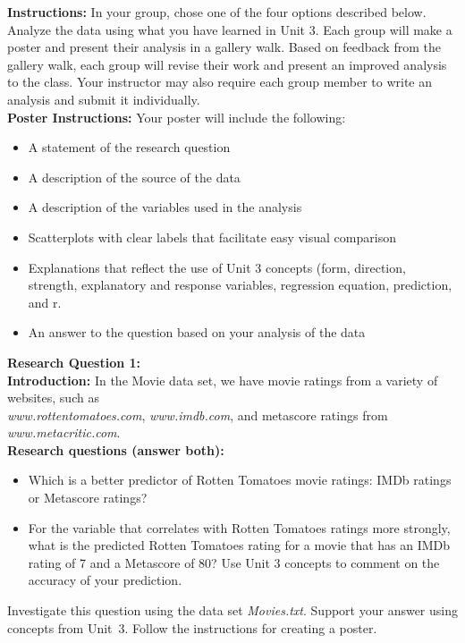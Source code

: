 

\textbf{Instructions:} In your group, chose one of the four options
described below. Analyze the data using what you have learned in Unit
3. Each group will make a poster and present their analysis in a gallery
walk. Based on feedback from the gallery walk, each group will revise
their work and present an improved analysis to the class. Your instructor
may also require each group member to write an analysis and submit
it individually. \\


\textbf{Poster Instructions:} Your poster will include the following: 
\begin{itemize}
\item A statement of the research question 
\item A description of the source of the data 
\item A description of the variables used in the analysis 
\item Scatterplots with clear labels that facilitate easy visual comparison 
\item Explanations that reflect the use of Unit 3 concepts (form, direction,
strength, explanatory and response variables, regression equation,
prediction, and r.
\item An answer to the question based on your analysis of the data \clearpage{}
\end{itemize}
\textbf{\large{}Research Question 1:}\\


\textbf{Introduction:} In the Movie data set, we have movie ratings
from a variety of websites, such as\\ \emph{www.rottentomatoes.com},
\emph{www.imdb.com}, and metascore ratings from \emph{www.metacritic.com}.
\\


\textbf{Research questions (answer both): } 
\begin{itemize}
\item Which is a better predictor of Rotten Tomatoes movie ratings: IMDb
ratings or Metascore ratings? \ 
\item For the variable that correlates with Rotten Tomatoes ratings more
strongly, what is the predicted Rotten Tomatoes rating for a movie
that has an IMDb rating of 7 and a Metascore of 80? Use Unit 3 concepts
to comment on the accuracy of your prediction. 
\end{itemize}
Investigate this question using the data set \emph{Movies.txt}. Support
your answer using concepts from Unit~3. Follow the instructions for
creating a poster.\bigskip{}
\bigskip{}
\bigskip{}


